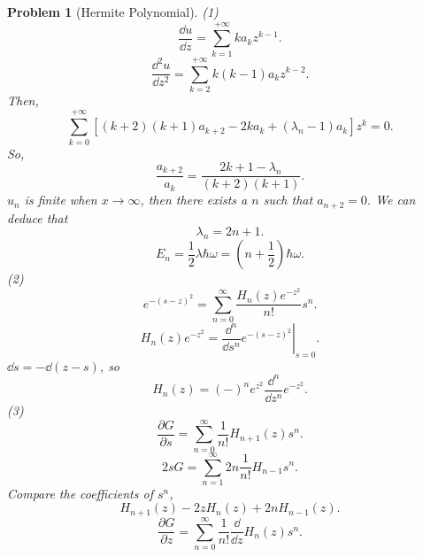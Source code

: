 \documentclass{article}
\theoremstyle{1}
\newtheorem{problem}{Problem}
\newcommand{\pa}{\partial}
\begin{document}
\begin{problem}[Hermite Polynomial]
    (1) \begin{equation}
        \frac{\dd{u}}{\dd{z}}=\sum_{k=1}^{+\infty}ka_kz^{k-1}.
    \end{equation}
    \begin{equation}
        \frac{\dd^2 u}{\dd{z}^2}=\sum_{k=2}^{+\infty}k(k-1)a_kz^{k-2}.
    \end{equation}
    Then, 
    \begin{equation}
        \sum_{k=0}^{+\infty}\left[(k+2)(k+1)a_{k+2}-2ka_k+(\lambda_n-1)a_k\right]z^k=0.
    \end{equation}
    So, 
    \begin{equation}
        \frac{a_{k+2}}{a_k}=\frac{2k+1-\lambda_n}{(k+2)(k+1)}.
    \end{equation}
    $u_n$ is finite when $x\rightarrow\infty$, then there exists a $n$ such that $a_{n+2}=0$. We can deduce that
    \begin{equation}
        \boxed{\lambda_n=2n+1.}
    \end{equation}
    \begin{equation}
        E_n=\frac{1}{2}\lambda \hbar \omega=\left(n+\frac{1}{2}\right)\hbar\omega.
    \end{equation}
    (2) \begin{equation}
        e^{-(s-z)^2}=\sum_{n=0}^{\infty}\frac{H_n(z)e^{-z^2}}{n!}s^n.
    \end{equation}
    \begin{equation}
        H_n(z)e^{-z^2}=\left.\frac{\dd^n}{\dd{s}^n}e^{-(s-z)^2}\right|_{s=0}.
    \end{equation}
    $\dd{s}=-\dd{(z-s)}$, so 
    \begin{equation}
        \boxed{H_n(z)=(-)^ne^{z^2}\frac{\dd ^n}{\dd{z}^n}e^{-z^2}.}
    \end{equation}
    (3) \begin{equation}
        \frac{\pa G}{\pa s}=\sum_{n=0}^{\infty}\frac{1}{n!}H_{n+1}(z)s^n.
    \end{equation}
    \begin{equation}
        2sG=\sum_{n=1}^{\infty}2n\frac{1}{n!}H_{n-1}s^n.
    \end{equation}
    Compare the coefficients of $s^n$,
    \begin{equation}
        \boxed{H_{n+1}(z)-2zH_n(z)+2nH_{n-1}(z).}
    \end{equation}
    \begin{equation}
        \frac{\pa G}{\pa z}=\sum_{n=0}^{\infty}\frac{1}{n!}\frac{\dd}{\dd z}H_n(z)s^n.

\end{equation}
\end{problem}
\end{document}
